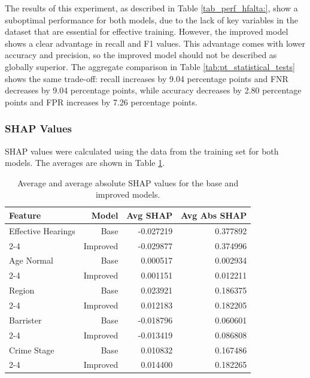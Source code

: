 \documentclass[fleqn,10pt]{wlscirep}
\begin{document}
The results of this experiment, as described in Table \ref{tab_perf_hfalta:}, show a suboptimal performance for both models, due to the lack of key variables in the dataset that are essential for effective training. However, the improved model shows a clear advantage in recall and F1 values. This advantage comes with lower accuracy and precision, so the improved model should not be described as globally superior. The aggregate comparison in Table \ref{tab:pt_statistical_tests} shows the same trade-off: recall increases by 9.04 percentage points and FNR decreases by 9.04 percentage points, while accuracy decreases by 2.80 percentage points and FPR increases by 7.26 percentage points.

\subsubsection{SHAP Values}

SHAP values were calculated using the data from the training set for both models. The averages are shown in Table \ref{tab:pt_shap_stats_base_improved}.

\begin{table}[h!]
\centering
\begin{tabular}{|l|r|r|r|}
\hline
\textbf{Feature} & \textbf{Model} & \textbf{Avg SHAP} & \textbf{Avg Abs SHAP} \\ \hline
Effective Hearings & Base      & -0.027219 &  0.377892 \\ \cline{2-4}
                   & Improved  & -0.029877 &  0.374996  \\ \hline
Age Normal         & Base      &  0.000517 &  0.002934 \\ \cline{2-4}
                   & Improved  & 0.001151 &  0.012211  \\ \hline
Region             & Base      &  0.023921 &  0.186375  \\ \cline{2-4}
                   & Improved  &  0.012183 &  0.182205  \\ \hline
Barrister          & Base      & -0.018796 &  0.060601  \\ \cline{2-4}
                   & Improved  & -0.013419 &  0.086808  \\ \hline
Crime Stage        & Base      &  0.010832 &  0.167486  \\ \cline{2-4}
                   & Improved  &  0.014400 &  0.182265  \\ \hline
\end{tabular}
\caption{Average and average absolute SHAP values for the base and improved models.}
\label{tab:pt_shap_stats_base_improved}
\end{table}
\end{document}
